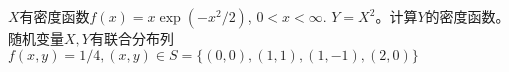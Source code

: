 \documentclass[11pt,addpoints,landscape]{exam}
\begin{document}
\begin{multicols}{2}
\begin{questions}
			\vspace{12cm}
			\question[10]
			$X$有密度函数$f(x) = x\exp(-x ^ 2 / 2)$, $0 < x < \infty$. $Y = X ^ 2$。计算$Y$的密度函数。\\
				\vfill\null
			\columnbreak
			\mbox{}
			\vspace{3cm}
			\question
			随机变量$X, Y$有联合分布列$f(x, y) = 1 / 4, (x, y) \in S = \{(0, 0), (1, 1), (1, -1), (2, 0)\}$
		\end{questions}
	\end{multicols}
\end{document}
